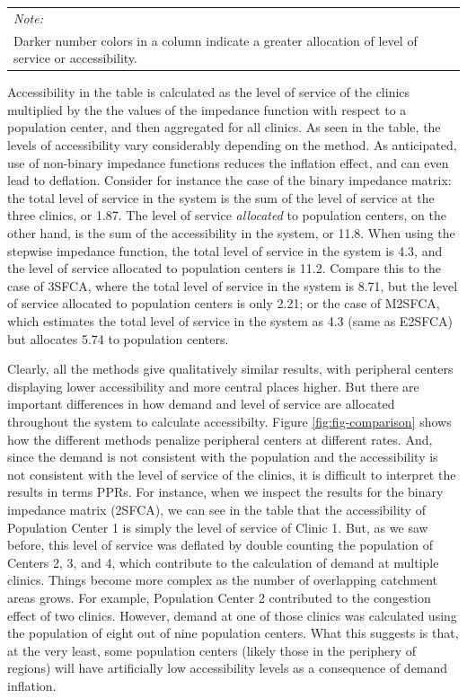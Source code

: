 \documentclass[10pt,letterpaper]{article}
\begin{document}
\begin{landscape}
\begin{table}[t]
\begin{tabular}{lrrrlllllllll}
\bottomrule
\multicolumn{13}{l}{\textit{Note: }}\\
\multicolumn{13}{l}{Darker number colors in a column indicate a greater allocation of level of service or accessibility. }\\
\end{tabular}
\end{table}
\end{landscape}

Accessibility in the table is calculated as the level of service of the
clinics multiplied by the the values of the impedance function with
respect to a population center, and then aggregated for all clinics. As
seen in the table, the levels of accessibility vary considerably
depending on the method. As anticipated, use of non-binary impedance
functions reduces the inflation effect, and can even lead to deflation.
Consider for instance the case of the binary impedance matrix: the total
level of service in the system is the sum of the level of service at the
three clinics, or 1.87. The level of service \emph{allocated} to
population centers, on the other hand, is the sum of the accessibility
in the system, or 11.8. When using the stepwise impedance function, the
total level of service in the system is 4.3, and the level of service
allocated to population centers is 11.2. Compare this to the case of
3SFCA, where the total level of service in the system is 8.71, but the
level of service allocated to population centers is only 2.21; or the
case of M2SFCA, which estimates the total level of service in the system
as 4.3 (same as E2SFCA) but allocates 5.74 to population centers.

Clearly, all the methods give qualitatively similar results, with
peripheral centers displaying lower accessibility and more central
places higher. But there are important differences in how demand and
level of service are allocated throughout the system to calculate
accessibilty. Figure \ref{fig:fig-comparison} shows how the different
methods penalize peripheral centers at different rates. And, since the
demand is not consistent with the population and the accessibility is
not consistent with the level of service of the clinics, it is difficult
to interpret the results in terms PPRs. For instance, when we inspect
the results for the binary impedance matrix (2SFCA), we can see in the
table that the accessibility of Population Center 1 is simply the level
of service of Clinic 1. But, as we saw before, this level of service was
deflated by double counting the population of Centers 2, 3, and 4, which
contribute to the calculation of demand at multiple clinics. Things
become more complex as the number of overlapping catchment areas grows.
For example, Population Center 2 contributed to the congestion effect of
two clinics. However, demand at one of those clinics was calculated
using the population of eight out of nine population centers. What this
suggests is that, at the very least, some population centers (likely
those in the periphery of regions) will have artificially low
accessibility levels as a consequence of demand inflation.
\end{document}
